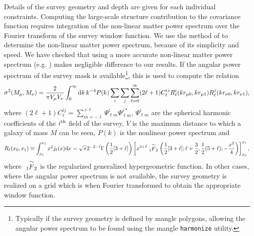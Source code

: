 Details of the survey geometry and depth are given for each individual constraints. Computing the large-scale structure contribution to the covariance function requires integration of the non-linear matter power spectrum over the Fourier transform of the survey window function. We use the method of \cite{peacock_non-linear_1996} to determine the non-linear matter power spectrum, because of its simplicity and speed. We have checked that using a more accurate non-linear matter power spectrum (e.g. \citealt{lawrence_coyote_2010}) makes negligible difference to our results. If the angular power spectrum of the survey mask is available\footnote{Typically if the survey geometry is defined by \protect\gls{mangle} polygons, allowing the angular power spectrum to be found using the \protect\gls{mangle} {\tt harmonize} utility.}, this is used to compute the relation
\begin{equation}
  \sigma^2(M_\mu,M_\nu) = {2 \over \pi V_\mu V_\nu}\int_0^\infty {\rm d} k\, k^{-4} P(k) \sum_i \sum_j \sum_{\ell=0}^\infty (2\ell+1) C^{ij}_\ell R^i_{\ell}(kr_{\mu 0},kr_{\mu 1}) R^j_{\ell}(kr_{\nu 0},kr_{\nu 1}),
\end{equation}
where $(2\ell+1) C^{ij}_\ell = \sum_{m=-\ell}^{+\ell} \Psi^i_{\ell m} \Psi^{j*}_{\ell m}$, $\Psi^i_{\ell m}$ are the spherical harmonic coefficients of the $i^{\rm th}$ field of the survey, $V$ is the maximum distance to which a galaxy of mass $M$ can be seen, $P(k)$ is the nonlinear power spectrum and
\begin{equation}
 R_{\ell}(x_0,x_1) \equiv \int_{x_0}^{x_1} x^2 j_\ell(x) {\rm d}x = \sqrt{\pi} 2^{-2-\ell} \Gamma\left({1\over 2}[3+\ell]\right) \left[ x^{3+\ell} \tensor*[_1]{\stackrel{\sim}{F}}{_2} \left({1\over 2}[3+\ell]; \ell+{3\over 2},{1\over 2}(5+\ell);-{x^2\over 4}\right)\right]_{x_0}^{x_1},
\end{equation}
where $\tensor*[_1]{\stackrel{\sim}{F}}{_2}$ is the regularized generalized hypergeometric function. In other cases, where the angular power spectrum is not available, the survey geometry is realized on a grid which is when Fourier transformed to obtain the appropriate window function.

